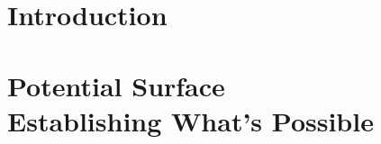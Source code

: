 \documentclass[footheight=20pt, footsepline, headheight=20pt, headsepline]{book}
\begin{document}
\newpage
\tableofcontents
\newpage

\part{Introduction}
\label{part:Introduction}


\part{
    Potential Surface
    \\
    \large{Establishing What's Possible}
}
\label{sec:PotentialSurface}





%

%
%
%

%

\printbibliography[heading=bibintoc,title={References}]
\end{document}
